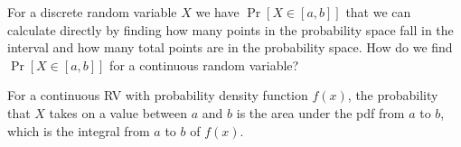 \question For a discrete random variable $X$ we have $\Pr[X \in [a, b]]$ 
that we can calculate directly by finding how many points in the 
probability space fall in the interval and how many total points are 
in the probability space. How do we find $\Pr[X \in [a, b]]$ for a 
continuous random variable?
\begin{solution}
For a continuous RV with probability density function $f(x)$, the 
probability that $X$ takes on a value between $a$ and $b$ is the area 
under the pdf from $a$ to $b$, which is the integral from $a$ to $b$ 
of $f(x)$.
\end{solution}